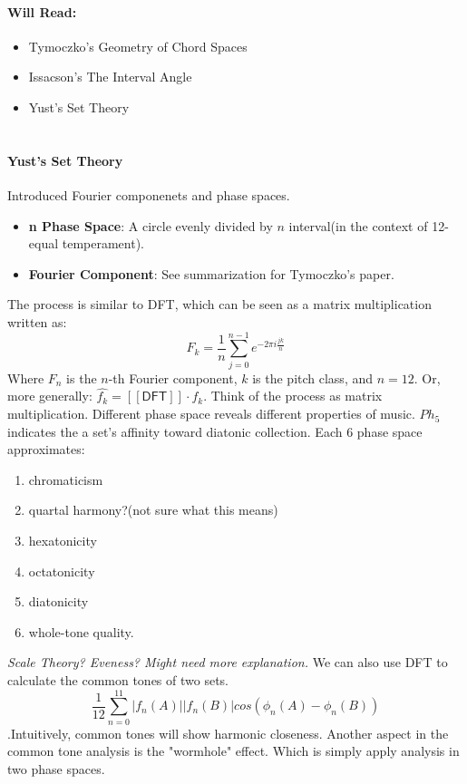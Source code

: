 \paragraph*{Will Read:}
\begin{itemize}
    \item Tymoczko's Geometry of Chord Spaces
    \item Issacson's The Interval Angle
    \item Yust's Set Theory
\end{itemize}

\section*{}
\paragraph*{Yust's Set Theory}
Introduced Fourier componenets and phase spaces. 
\begin{itemize}
    \item \textbf{n Phase Space}: A circle evenly divided by $n$ interval(in the context of 12-equal temperament).
    \item \textbf{Fourier Component}: See summarization for Tymoczko's paper.
\end{itemize}
The process is similar to DFT, which can be seen as a matrix multiplication written as:
\[F_k=\frac{1}{n}\sum_{j=0}^{n-1}e^{-2\pi i\frac{jk}{n}}\]
Where $F_n$ is the $n$-th Fourier component, $k$ is the pitch class, and $n=12$. Or, more generally:
$\hat{f_k}=[[\mathsf{DFT}]]\cdot f_k$. Think of the process as matrix multiplication.
Different phase space reveals different properties of music. $Ph_5$ indicates 
the a set's affinity toward diatonic collection. Each $6$ phase space approximates:
\begin{enumerate}
    \item chromaticism
    \item quartal harmony?(not sure what this means)
    \item hexatonicity
    \item octatonicity
    \item diatonicity
    \item whole-tone quality.
\end{enumerate}
\emph{Scale Theory? Eveness? Might need more explanation.}
We can also use DFT to calculate the common tones of two sets. 
\[\frac{1}{12}\sum_{n=0}^{11}|f_n(A)||f_n(B)|cos(\phi_n(A)-\phi_n(B))\].Intuitively,
common tones will show harmonic closeness. Another aspect in the common tone analysis
is the "wormhole" effect. Which is simply apply analysis in two phase spaces.

